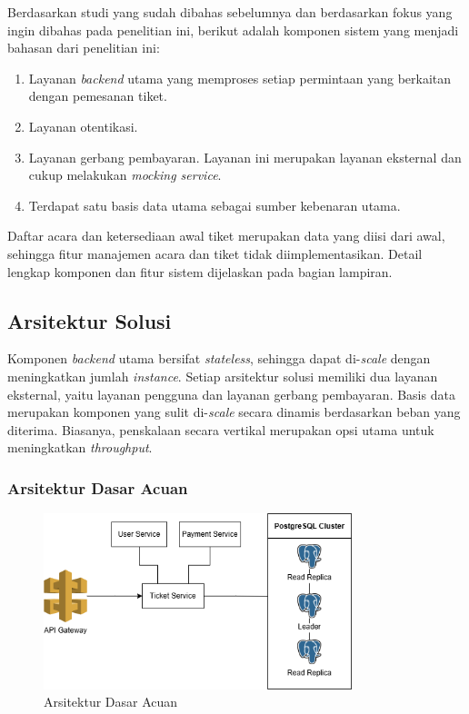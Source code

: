 Berdasarkan studi yang sudah dibahas sebelumnya dan berdasarkan fokus yang ingin dibahas pada penelitian ini, berikut adalah komponen sistem yang menjadi bahasan dari penelitian ini:

\begin{enumerate}
  \item Layanan \textit{backend} utama yang memproses setiap permintaan yang berkaitan dengan pemesanan tiket.
  \item Layanan otentikasi.
  \item Layanan gerbang pembayaran. Layanan ini merupakan layanan eksternal dan cukup melakukan \textit{mocking service}.
  \item Terdapat satu basis data utama sebagai sumber kebenaran utama.
\end{enumerate}

Daftar acara dan ketersediaan awal tiket merupakan data yang diisi dari awal, sehingga fitur manajemen acara dan tiket tidak diimplementasikan. Detail lengkap komponen dan fitur sistem dijelaskan pada bagian lampiran.

\subsection{Arsitektur Solusi}

Komponen \textit{backend} utama bersifat \textit{stateless}, sehingga dapat di-\textit{scale} dengan meningkatkan jumlah \textit{instance}. Setiap arsitektur solusi memiliki dua layanan eksternal, yaitu layanan pengguna dan layanan gerbang pembayaran. Basis data merupakan komponen yang sulit di-\textit{scale} secara dinamis berdasarkan beban yang diterima. Biasanya, penskalaan secara vertikal merupakan opsi utama untuk meningkatkan \textit{throughput}.

\subsubsection{Arsitektur Dasar Acuan}

\begin{figure}[ht]
  \centering
  \includegraphics[width=0.8\textwidth]{resources/chapter-3/architecture-reference.png}
  \caption{Arsitektur Dasar Acuan}
  \label{fig:baseline-architecture}
\end{figure}

